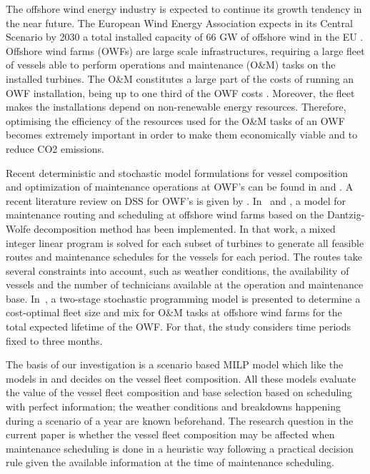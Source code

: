 The offshore wind energy industry is expected to continue its growth tendency in the near future. The European Wind Energy Association expects in its Central Scenario by 2030 a total installed capacity of 66 GW of offshore wind in the EU \cite{WES2030}.
%
Offshore wind farms (OWFs) are large scale infrastructures, requiring a large fleet of vessels able to perform operations and maintenance (O\&M) tasks on the installed turbines. The O\&M constitutes a large part of the costs of running an OWF installation, being up to one third of the OWF costs \cite{Snyder20091567}. Moreover, the fleet makes the installations  depend on non-renewable energy resources. Therefore, optimising the efficiency of the resources used for the O\&M tasks of an OWF becomes extremely important in order to make them economically viable and to reduce CO2 emissions.

Recent deterministic and stochastic model formulations for vessel composition and  optimization of maintenance operations at OWF's can be found in \cite{Gundegjerde2015} and \cite{HALVORSENWEARE2013}. A recent literature review on DSS for OWF's is given by \cite{hofmannrev}.
%
In~\cite{LijuanDai,EJOR2016} and \cite{STALHANE201592}, a model for maintenance routing and scheduling at offshore wind farms based on the Dantzig-Wolfe decomposition method has been implemented.
In that work, a mixed integer linear program is solved for each subset of turbines to generate all  feasible routes and maintenance schedules for the vessels for each period.
The routes take several constraints into account, such as weather conditions, the availability of vessels and the number of technicians available at the operation and maintenance base.
%
In~\cite{Stalhane2016357}, a two-stage stochastic programming model is presented to determine a cost-optimal fleet size and mix for O\&M tasks at offshore wind farms for the total expected lifetime of the OWF. For that, the study considers time periods fixed to three months.

The basis of our investigation is a scenario based MILP model which like the models in \cite{HALVORSENWEARE2013} and \cite{Stalhane2016357} decides on the vessel fleet composition. All these models evaluate the value of the vessel fleet composition and base selection based on scheduling with perfect information; the weather conditions and breakdowns happening during a scenario of a year are known beforehand. The research question in the current paper is whether the vessel fleet composition may be affected when maintenance scheduling is done in a heuristic way following a practical decision rule given the available information at the time of maintenance scheduling.


